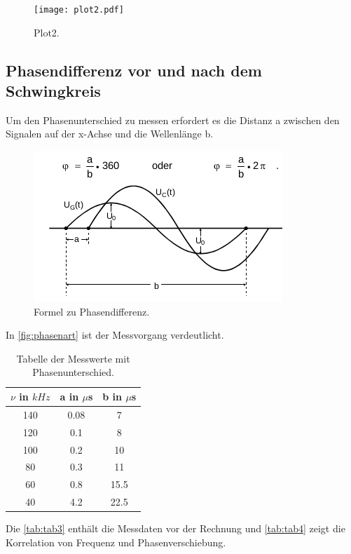 \begin{figure}
  \centering
  \texttt{[image: plot2.pdf]}
  \caption{Plot2.}
  \label{fig:plot2}
\end{figure}

\newpage
\subsection{Phasendifferenz vor und nach dem Schwingkreis}
Um den Phasenunterschied zu messen erfordert es die Distanz a zwischen den Signalen auf der x-Achse und die Wellenlänge b.\\

\begin{figure}[htb]
  \centering
  \caption{Formel zu Phasendifferenz.}
  \label{fig:phasenart}
  \includegraphics[scale = 0.5]{content/Phasendar.png}
\end{figure}

In \autoref{fig:phasenart} ist der Messvorgang verdeutlicht.\\

\begin{table}[htb]
  \centering
  \caption{Tabelle der Messwerte mit Phasenunterschied.}
  \label{tab:tab3}
  \begin{tabular}{c c c}
    \toprule
    $\nu$ in $kHz$ & a in $\mu$s & b in $\mu$s\\
    \midrule
    140 & 0.08 & 7\\
    120 & 0.1 & 8\\
    100 & 0.2 & 10\\
    80 & 0.3 & 11\\
    60 & 0.8 & 15.5\\
    40 & 4.2 & 22.5\\
    \bottomrule
  \end{tabular}
\end{table}
\newpage
Die \autoref{tab:tab3} enthält die Messdaten vor der Rechnung und \autoref{tab:tab4} zeigt die Korrelation von Frequenz und Phasenverschiebung.\\

